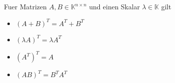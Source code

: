Fuer Matrizen $A,B \in \mathbb{K}^{n \times n}$  und einen Skalar $\lambda \in \mathbb{K}$ gilt
\begin{itemize}
	\item $(A + B)^T = A^T + B^T$ 
	\item $(\lambda A)^T = \lambda A^T$ 
	\item $(A^T)^T = A$ 
	\item $(A B)^T = B^T A^T$ 
\end{itemize}
